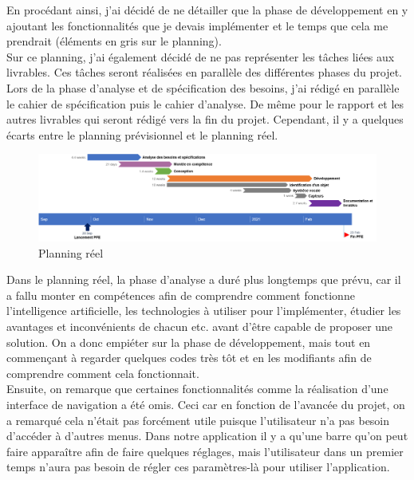 \documentclass[UTF8]{EPURapport}
\begin{document}
En procédant ainsi, j'ai décidé de ne détailler que la phase de développement en y ajoutant les fonctionnalités que je devais implémenter et le temps que cela me prendrait (éléments en gris sur le planning).\\

Sur ce planning, j'ai également décidé de ne pas représenter les tâches liées aux livrables. Ces tâches seront réalisées en parallèle des différentes phases du projet. Lors de la phase d'analyse et de spécification des besoins, j'ai rédigé en parallèle le cahier de spécification puis le cahier d'analyse. De même pour le rapport et les autres livrables qui seront rédigé vers la fin du projet. Cependant, il y a quelques écarts entre le planning prévisionnel et le planning réel. \\

\begin{figure}[h!]
\centering
  \includegraphics[width=\textwidth]{images/PlanningReel.png}
  \caption{Planning réel}
  \label{fig:planningreel}
\end{figure}

Dans le planning réel, la phase d'analyse a duré plus longtemps que prévu, car il a fallu monter en compétences afin de comprendre comment fonctionne l'intelligence artificielle, les technologies à utiliser pour l'implémenter, étudier les avantages et inconvénients de chacun etc. avant d'être capable de proposer une solution. On a donc empiéter sur la phase de développement, mais tout en commençant à regarder quelques codes très tôt et en les modifiants afin de comprendre comment cela fonctionnait. \\

Ensuite, on remarque que certaines fonctionnalités comme la réalisation d'une interface de navigation a été omis. Ceci car en fonction de l'avancée du projet, on a remarqué cela n'était pas forcément utile puisque l'utilisateur n'a pas besoin d'accéder à d'autres menus. Dans notre application il y a qu'une barre qu'on peut faire apparaître afin de faire quelques réglages, mais l'utilisateur dans un premier temps n'aura pas besoin de régler ces paramètres-là pour utiliser l'application. \\
\end{document}
